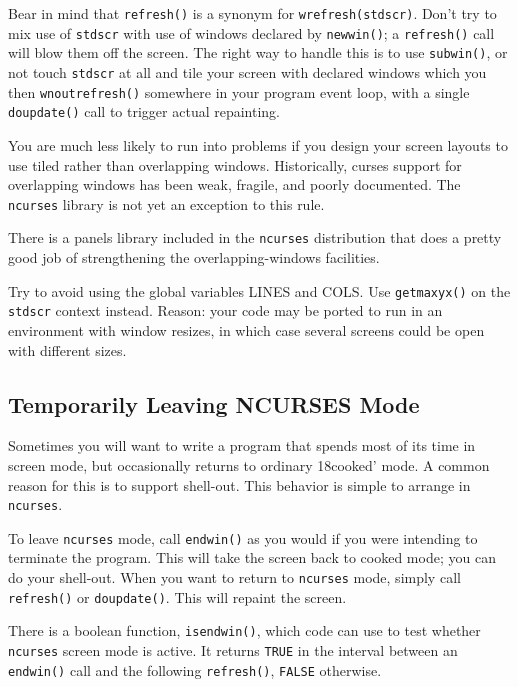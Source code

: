 Bear in mind that \texttt{refresh()} is a synonym for \texttt{wrefresh(stdscr)}.
Don't try to mix use of \texttt{stdscr} with use of windows declared
by \texttt{newwin()}; a \texttt{refresh()} call will blow them off the
screen.  The right way to handle this is to use \texttt{subwin()}, or
not touch \texttt{stdscr} at all and tile your screen with declared
windows which you then \texttt{wnoutrefresh()} somewhere in your program
event loop, with a single \texttt{doupdate()} call to trigger actual
repainting. 

You are much less likely to run into problems if you design your screen
layouts to use tiled rather than overlapping windows.  Historically,
curses support for overlapping windows has been weak, fragile, and poorly
documented.  The \texttt{ncurses} library is not yet an exception to this
rule. 

There is a panels library included in the \texttt{ncurses}
distribution that does a pretty good job of strengthening the
overlapping-windows facilities. 

Try to avoid using the global variables LINES and COLS.  Use
\texttt{getmaxyx()} on the \texttt{stdscr} context instead.  Reason:
your code may be ported to run in an environment with window resizes,
in which case several screens could be open with different sizes.

\subsection{Temporarily Leaving NCURSES Mode}

\label{f0:leaving}Sometimes you will want to write a program that spends most of its time in
screen mode, but occasionally returns to ordinary \char18cooked' mode.  A common
reason for this is to support shell-out.  This behavior is simple to arrange
in \texttt{ncurses}. 

To leave \texttt{ncurses} mode, call \texttt{endwin()} as you would if you
were intending to terminate the program.  This will take the screen back to
cooked mode; you can do your shell-out.  When you want to return to
\texttt{ncurses} mode, simply call \texttt{refresh()} or \texttt{doupdate()}.
This will repaint the screen. 

There is a boolean function, \texttt{isendwin()}, which code can use to
test whether \texttt{ncurses} screen mode is active.  It returns \texttt{TRUE}
in the interval between an \texttt{endwin()} call and the following
\texttt{refresh()}, \texttt{FALSE} otherwise.  

